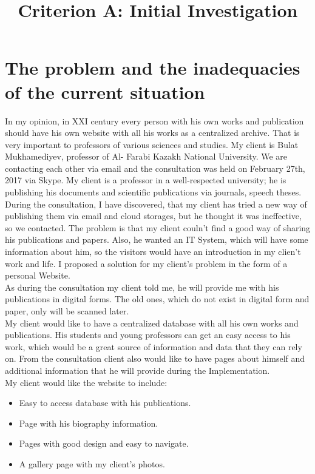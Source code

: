 \documentclass[a4paper]{article}
\title{Criterion A: Initial Investigation}
\date{}
\begin{document}
\maketitle
\section*{The problem and the inadequacies of the current situation}

In my opinion, in XXI century every person with his own works and publication should have his own website with all his works as a centralized archive. That is very important to professors of various sciences and studies. My client is Bulat Mukhamediyev, professor of Al- Farabi Kazakh National University. We are contacting each other via email and the consultation was held on February 27th, 2017 via Skype. My client is a professor in a well-respected university; he is publishing his documents and scientific publications via journals, speech theses. \\

During the consultation, I have discovered, that my client has tried a new way of publishing them via email and cloud storages, but he thought it was ineffective, so we contacted. The problem is that my client couln't find a good way of sharing his publications and papers. Also, he wanted an IT System, which will have some information about him, so the visitors would have an introduction in my clien't work and life. I proposed a solution for my client's problem in the form of a personal Website.\\

As during the consultation my client told me, he will provide me with his publications in digital forms. The old ones, which do not exist in digital form and paper, only will be scanned later.\\

My client would like to have a centralized database with all his own works and publications. His students and young professors can get an easy access to his work, which would be a great source of information and data that they can rely on. From the consultation client also would like to have pages about himself and additional information that he will provide during the Implementation.\\

My client would like the website to include:

\begin{itemize}
    \item Easy to access database with his publications.
    \item Page with his biography information.
    \item Pages with good design and easy to navigate.
    \item A gallery page with my client's photos.
\end{itemize}
\end{document}
